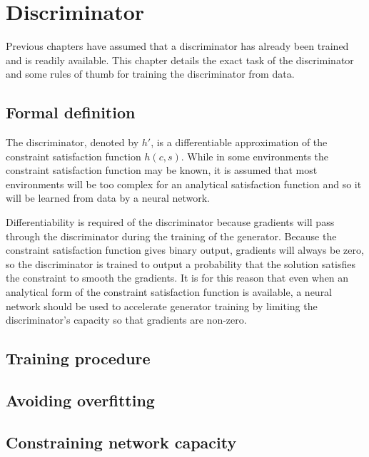 \documentclass[../../main.tex]{subfiles}
\begin{document}
\chapter{Discriminator}

Previous chapters have assumed that a discriminator has already been trained and is readily available.
This chapter details the exact task of the discriminator and some rules of thumb for training the discriminator from data.

\section{Formal definition}

The discriminator, denoted by $h'$, is a differentiable approximation of the constraint satisfaction function $h(c, s)$.
While in some environments the constraint satisfaction function may be known, it is assumed that most environments will be too complex for an analytical satisfaction function and so it will be learned from data by a neural network.

Differentiability is required of the discriminator because gradients will pass through the discriminator during the training of the generator.
Because the constraint satisfaction function gives binary output, gradients will always be zero, so the discriminator is trained to output a probability that the solution satisfies the constraint to smooth the gradients.
It is for this reason that even when an analytical form of the constraint satisfaction function is available, a neural network should be used to accelerate generator training by limiting the discriminator's capacity so that gradients are non-zero.

\section{Training procedure}

\section{Avoiding overfitting}

\section{Constraining network capacity}
\end{document}
